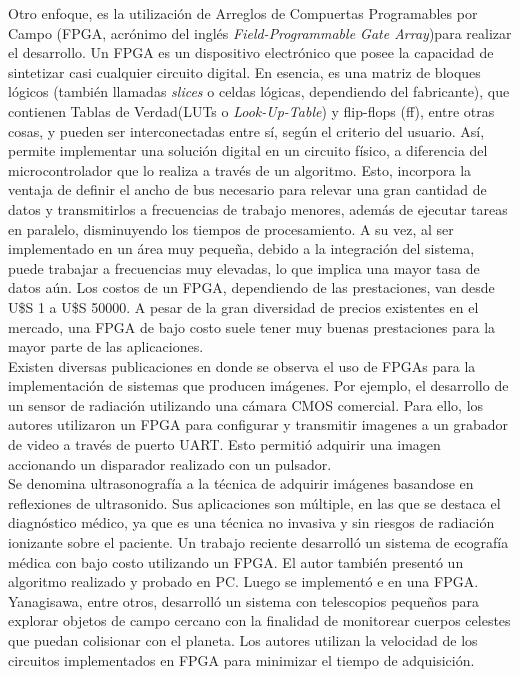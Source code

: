 Otro enfoque, es la utilización de Arreglos de Compuertas Programables por Campo (FPGA, acrónimo del inglés {\it Field-Programmable Gate Array})para realizar el desarrollo. Un FPGA es un dispositivo electrónico que posee la capacidad de sintetizar casi cualquier circuito digital. En esencia, es una matriz de bloques lógicos (también llamadas {\it slices} o celdas lógicas, dependiendo del fabricante), que contienen Tablas de Verdad(LUTs o {\it Look-Up-Table}) y flip-flops (ff), entre otras cosas, y pueden ser interconectadas entre sí, según el criterio del usuario. Así, permite implementar una solución digital en un circuito físico, a diferencia del microcontrolador que lo realiza a través de un algoritmo. Esto, incorpora la ventaja de definir el ancho de bus necesario para relevar una gran cantidad de datos y transmitirlos a frecuencias de trabajo menores, además de ejecutar tareas en paralelo, disminuyendo los tiempos de procesamiento. A su vez, al ser implementado en un área muy pequeña, debido a la integración del sistema, puede trabajar a frecuencias muy elevadas, lo que implica una mayor tasa de datos aún. Los costos de un FPGA, dependiendo de las prestaciones, van desde U\$S 1 a U\$S \SI{50000}{}. A pesar de la gran diversidad de precios existentes en el mercado, una FPGA de bajo costo suele tener muy buenas prestaciones para la mayor parte de las aplicaciones.\\

Existen diversas publicaciones en donde se observa el uso de FPGAs para la implementación de sistemas que producen imágenes. Por ejemplo, el desarrollo de un sensor de radiación utilizando una cámara CMOS comercial. Para ello, los autores utilizaron un FPGA para configurar y transmitir imagenes a un grabador de video a través de puerto UART. Esto permitió adquirir una imagen accionando un disparador realizado con un pulsador\cite{Perez2017}.\\

Se denomina ultrasonografía a la técnica de adquirir imágenes basandose en reflexiones de ultrasonido. Sus aplicaciones son múltiple, en las que se destaca el diagnóstico médico, ya que es una técnica no invasiva y sin riesgos de radiación ionizante sobre el paciente. Un trabajo reciente desarrolló un sistema de ecografía médica con bajo costo utilizando un FPGA\cite{biswas2018embedded}. El autor también presentó un algoritmo realizado y probado en PC. Luego se implementó e en una FPGA.\\

Yanagisawa, entre otros, desarrolló un sistema con telescopios pequeños para explorar objetos de campo cercano con la finalidad de monitorear cuerpos celestes que puedan colisionar con el planeta\cite{Yanagisawa2018}. Los autores utilizan la velocidad de los circuitos implementados en FPGA para minimizar el tiempo de adquisición.\\

